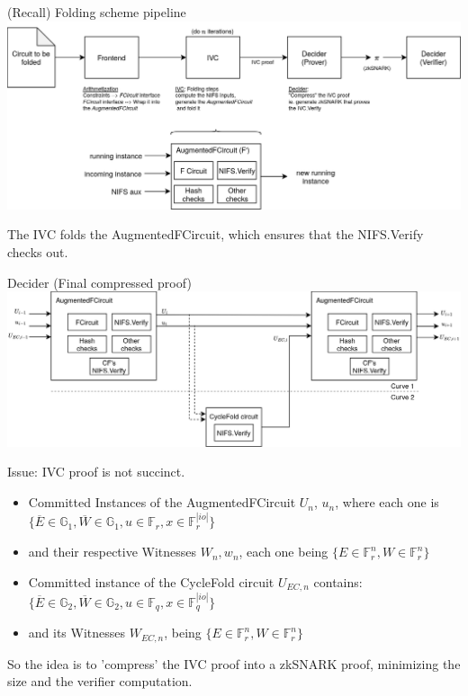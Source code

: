 \documentclass[t]{beamer} \usefonttheme[onlymath]{serif}
\begin{document}
\begin{frame}{(Recall) Folding scheme pipeline}
  \includegraphics[width=\textwidth]{folding-scheme-pipeline}

  \vspace{0.5cm}
  {\scriptsize
  The IVC folds the AugmentedFCircuit, which ensures that the NIFS.Verify checks out.
  }
\end{frame}


\begin{frame}{Decider (Final compressed proof)}
  \vspace{-0.5cm}
  \includegraphics[width=\textwidth]{decider-instances}

  {\scriptsize
  Issue: IVC proof is not succinct.
  \begin{itemize}
    \item Committed Instances of the AugmentedFCircuit $U_n$, $u_n$, where each one is $\{ \overline{E} \in \mathbb{G}_1, \overline{W} \in \mathbb{G}_1, u \in \mathbb{F}_r, x \in \mathbb{F}_r^{|io|} \}$
    \item and their respective Witnesses $W_n, w_n$, each one being $\{E \in \mathbb{F}_r^n, W \in \mathbb{F}_r^n \}$
    \item Committed instance of the CycleFold circuit $U_{EC,n}$ contains: $\{ \overline{E} \in \mathbb{G}_2, \overline{W} \in \mathbb{G}_2, u \in \mathbb{F}_q, x \in \mathbb{F}_q^{|io|} \}$
    \item and its Witnesses $W_{EC,n}$, being $\{E \in \mathbb{F}_r^n, W \in \mathbb{F}_r^n \}$
  \end{itemize}
  So the idea is to 'compress' the IVC proof into a zkSNARK proof, minimizing the size and the verifier computation.
  }

\end{frame}
\end{document}
